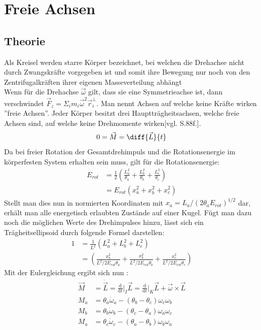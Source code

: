 \documentclass{include/protokollclass}
\begin{document}
    \chapter{Freie Achsen}
    
    \section{Theorie}
    Als Kreisel werden starre Körper bezeichnet, bei welchen die Drehachse nicht durch Zwangskräfte vorgegeben ist und somit ihre Bewegung nur noch von den Zentrifugalkräften ihrer eigenen Masseverteilung abhängt\\ Wenn für die Drehachse $\vec{\omega}$ gilt, dass sie eine Symmetrieachse ist, dann verschwindet $
        \vec{F}_z = \Sigma_i m_i \vec{\omega}^2 \vec{r}_i^{\perp}
    $. Man nennt Achsen auf welche keine Kräfte wirken ''freie Achsen''. Jeder Körper besitzt drei Hauptträgheitsachsen, welche freie Achsen sind, auf welche keine Drehmomente wirken\cite{Meschede2015}[vgl. S.88f.].
    \begin{equation}
        0=\vec{M}=\diff{\vec{L}}{t}
    \end{equation}
    Da bei freier Rotation der Gesamtdrehimpuls und die Rotationsenergie im körperfesten System erhalten sein muss, gilt für die Rotationsenergie:
    \begin{align}\label{eq:2.2}
        E_{rot} &= \frac{1}{2}\left(\frac{L_a^2}{\theta_a}+\frac{L_b^2}{\theta_b}+\frac{L_c^2}{\theta_c}\right)\\
        \nonumber &=E_{rot}\left(x_a^2+x_b^2+x_c^2\right)
    \end{align}
    Stellt man dies nun in normierten Koordinaten mit $x_a=L_a/\left(2\theta_aE_{rot}\right)^{1/2}$ dar, erhält man alle energetisch erlaubten Zustände auf einer Kugel. Fügt man dazu noch die möglichen Werte des Drehimpulses hinzu, lässt sich ein Trägheitsellipsoid durch folgende Formel darstellen\cite[vgl.S.88f.]{Meschede2015}:
    \begin{align}\label{eq:2.3}
        1&=\frac{1}{L^2}\left(L_a^2+L_b^2+L_c^2\right)\\
        \nonumber&=\left(\frac{x_a^2}{L^2/2E_{rot}\theta_a}+\frac{x_b^2}{L^2/2E_{rot}\theta_b}+\frac{x_c^2}{L^2/2E_{rot}\theta_c}\right)
    \end{align}
    Mit der Eulergleichung ergibt sich nun : 
    \begin{align}
        \vec{M}&=\dot{\vec{L}}=\frac{\mathrm{d}}{\mathrm{d}t}\Big\vert_I\vec{L}=\frac{\mathrm{d}}{\mathrm{d}t}\Big\vert_K\vec{L}+\vec{\omega}\times\vec{L}\\
        M_a&=\theta_a \dot{\omega}_a-(\theta_b-\theta_c)\omega_c\omega_b\\\nonumber
        M_b&=\theta_b \dot{\omega}_b-(\theta_c-\theta_a)\omega_a\omega_c\\\nonumber
        M_a&=\theta_c \dot{\omega}_c-(\theta_a-\theta_b)\omega_b\omega_a\\\nonumber
    \end{align}
    
\end{document}
